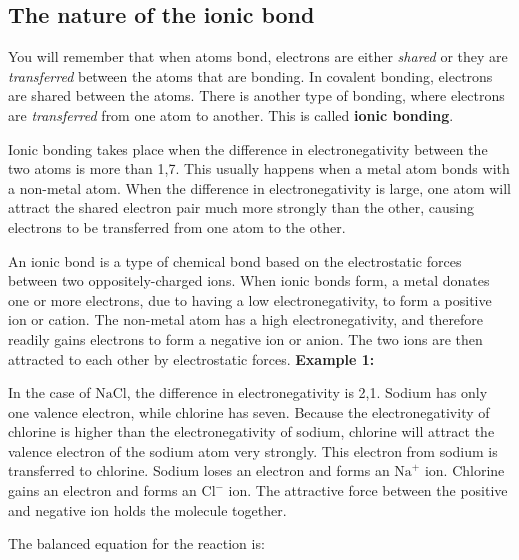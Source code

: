             \subsection*{The nature of the ionic bond}
            \nopagebreak
        \label{m38684*id142190}You will remember that when atoms bond, electrons are either \textsl{shared} or they are \textsl{transferred} between the atoms that are bonding. In covalent bonding, electrons are shared between the atoms. There is another type of bonding, where electrons are \textsl{transferred} from one atom to another. This is called \textbf{ionic bonding}.\par 
        \label{m38684*id142218}Ionic bonding takes place when the difference in electronegativity between the two atoms is more than 1,7. This usually happens when a metal atom bonds with a non-metal atom. When the difference in electronegativity is large, one atom will attract the shared electron pair much more strongly than the other, causing electrons to be transferred from one atom to the other.\par 
\label{m38684*fhsst!!!underscore!!!id456}
 { \label{m38684*meaningfhsst!!!underscore!!!id456}
        An ionic bond is a type of chemical bond based on the electrostatic forces between two oppositely-charged ions. When ionic bonds form, a metal donates one or more electrons, due to having a low electronegativity, to form a positive ion or cation. The non-metal atom has a high electronegativity, and therefore readily gains electrons to form a negative ion or anion. The two ions are then attracted to each other by electrostatic forces.
         } 
        \label{m38684*id142248}
          \textbf{Example 1:}
        \par 
        \label{m38684*id142255}In the case of $\mathrm{NaCl}$, the difference in electronegativity is 2,1. Sodium has only one valence electron, while chlorine has seven. Because the electronegativity of chlorine is higher than the electronegativity of sodium, chlorine will attract the valence electron of the sodium atom very strongly. This electron from sodium is transferred to chlorine. Sodium loses an electron and forms an ${\mathrm{Na}}^{+}$ ion. Chlorine gains an electron and forms an ${\mathrm{Cl}}^{-}$ ion. The attractive force between the positive and negative ion holds the molecule together.\par 
        \label{m38684*id142300}The balanced equation for the reaction is:\par 
        \label{m38684*id142305}\nopagebreak\noindent{}
